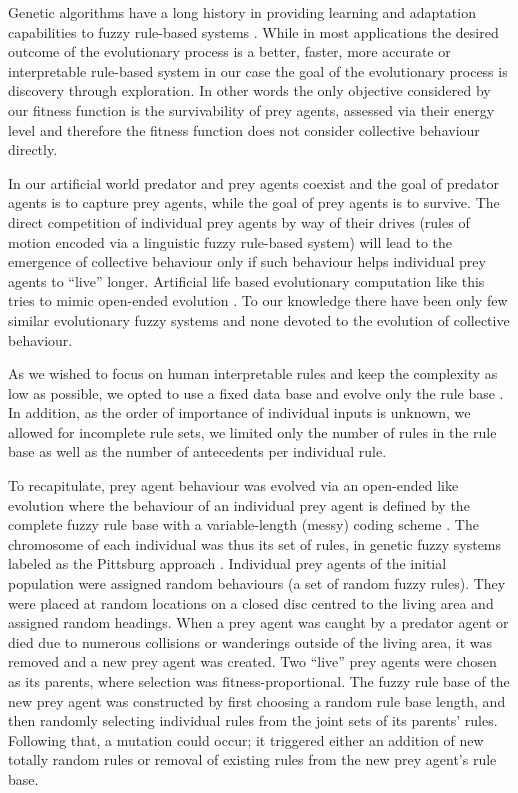 Genetic algorithms have a long history in providing learning and adaptation capabilities to fuzzy rule-based systems \cite{herrera2008genetic,fazzolari2013review}. While in most applications the desired outcome of the evolutionary process is a better, faster, more accurate or interpretable rule-based system \cite{casillias2003accuracy,casillias2003interpretability,cordon2011historical} in our case the goal of the evolutionary process is discovery through exploration. In other words the only objective considered by our fitness function is the survivability of prey agents, assessed via their energy level and therefore the fitness function does not consider collective behaviour directly.

In our artificial world predator and prey agents coexist and the goal of predator agents is to capture prey agents, while the goal of prey agents is to survive. The direct competition of individual prey agents by way of their drives (\ie rules of motion encoded via a linguistic fuzzy rule-based system) will lead to the emergence of collective behaviour only if such behaviour helps individual prey agents to ``live'' longer. Artificial life based evolutionary computation like this tries to mimic open-ended evolution \cite{aguilar2014thepast,mitchell1994genetic,soros2014identifying}. To our knowledge there have been only few similar evolutionary fuzzy systems \cite{barriosrolania2015bacterially,halavati2005fuzzy} and none devoted to the evolution of collective behaviour.

As we wished to focus on human interpretable rules and keep the complexity as low as possible, we opted to use a fixed data base and evolve only the rule base \cite{cordon2004ten}. In addition, as the order of importance of individual inputs is unknown, we allowed for incomplete rule sets, \ie we limited only the number of rules in the rule base as well as the number of antecedents per individual rule.

To recapitulate, prey agent behaviour was evolved via an open-ended like evolution where the behaviour of an individual prey agent is defined by the complete fuzzy rule base with a variable-length (messy) coding scheme \cite{hoffman1997evolutionary}. The chromosome of each individual was thus its set of rules, in genetic fuzzy systems labeled as the Pittsburg approach \cite{herrera2008genetic}. Individual prey agents of the initial population were assigned random behaviours (\ie a set of random fuzzy rules). They were placed at random locations on a closed disc centred to the living area and assigned random headings. When a prey agent was caught by a predator agent or died due to numerous collisions or wanderings outside of the living area, it was removed and a new prey agent was created. Two ``live'' prey agents were chosen as its parents, where selection was fitness-proportional. The fuzzy rule base of the new prey agent was constructed by first choosing a random rule base length, and then randomly selecting individual rules from the joint sets of its parents' rules. Following that, a mutation could occur; it triggered either an addition of new totally random rules or removal of existing rules from the new prey agent's rule base. 

